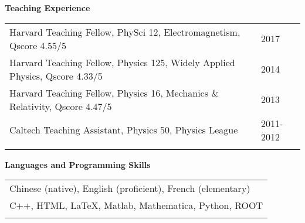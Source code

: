 \documentclass[letterpaper,11pt,oneside]{article}
\begin{document}
\raggedright
\textbf{\Large{Teaching Experience}} \\
\vspace{-0.5cm}
 \normalsize
\begin{flushleft}
\hspace{1cm}
    \begin{tabular}{@{} l l }
 Harvard Teaching Fellow, PhySci 12, Electromagnetism, Qscore 4.55/5  & 2017\\
 Harvard Teaching Fellow, Physics 125, Widely Applied Physics, Qscore 4.33/5  & 2014\\
 Harvard Teaching Fellow, Physics 16, Mechanics \& Relativity, Qscore 4.47/5 & 2013\\
 Caltech Teaching Assistant, Physics 50, Physics League & 2011-2012\\
    \hspace{0.8\linewidth} & \hspace{0.1\linewidth} \\
     \end{tabular}
\end{flushleft}
\vspace{-0.25cm}

 \raggedright
 \textbf{\Large{Languages and Programming Skills}} \\
 \normalsize
 \begin{flushleft}
 \begin{tabular}{@{} l}
     Chinese (native), English (proficient), French (elementary)\\
     C++, HTML, \LaTeX, Matlab, Mathematica, Python, ROOT \\
     \\
      \end{tabular}
\end{flushleft}



\clearpage
\end{document}
